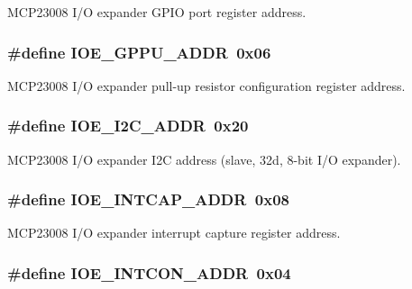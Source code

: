 M\-C\-P23008 I/\-O expander G\-P\-I\-O port register address. \hypertarget{a00008_a91e588d697383f94de2bf7f11d9ecb4b}{
\subsubsection[{I\-O\-E\-\_\-\-G\-P\-P\-U\-\_\-\-A\-D\-D\-R}]{\setlength{\rightskip}{0pt plus 5cm}\#define I\-O\-E\-\_\-\-G\-P\-P\-U\-\_\-\-A\-D\-D\-R~0x06}}\label{a00008_a91e588d697383f94de2bf7f11d9ecb4b}
M\-C\-P23008 I/\-O expander pull-\/up resistor configuration register address. \hypertarget{a00008_ad615a329bea187ce779cf9930ba8a6fa}{
\subsubsection[{I\-O\-E\-\_\-\-I2\-C\-\_\-\-A\-D\-D\-R}]{\setlength{\rightskip}{0pt plus 5cm}\#define I\-O\-E\-\_\-\-I2\-C\-\_\-\-A\-D\-D\-R~0x20}}\label{a00008_ad615a329bea187ce779cf9930ba8a6fa}
M\-C\-P23008 I/\-O expander I2\-C address (slave, 32d, 8-\/bit I/\-O expander). \hypertarget{a00008_ac0afd8503a8584599cc81f3d9b0a04dc}{
\subsubsection[{I\-O\-E\-\_\-\-I\-N\-T\-C\-A\-P\-\_\-\-A\-D\-D\-R}]{\setlength{\rightskip}{0pt plus 5cm}\#define I\-O\-E\-\_\-\-I\-N\-T\-C\-A\-P\-\_\-\-A\-D\-D\-R~0x08}}\label{a00008_ac0afd8503a8584599cc81f3d9b0a04dc}
M\-C\-P23008 I/\-O expander interrupt capture register address. \hypertarget{a00008_a90945d9544eebc892154f1e0443b1407}{
\subsubsection[{I\-O\-E\-\_\-\-I\-N\-T\-C\-O\-N\-\_\-\-A\-D\-D\-R}]{\setlength{\rightskip}{0pt plus 5cm}\#define I\-O\-E\-\_\-\-I\-N\-T\-C\-O\-N\-\_\-\-A\-D\-D\-R~0x04}}\label{a00008_a90945d9544eebc892154f1e0443b1407}
